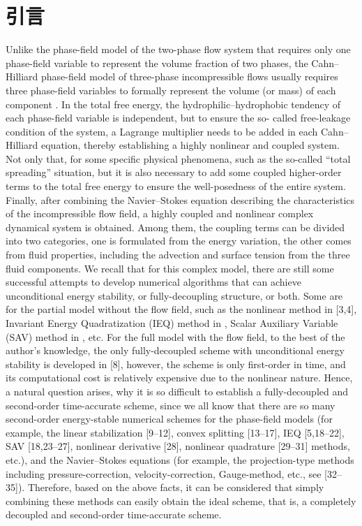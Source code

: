 \section{引言}
\label{sec:intro}
Unlike the phase-field model of the two-phase flow system that requires only one phase-field variable to represent the volume fraction of two phases, the Cahn–Hilliard phase-field model of three-phase incompressible flows usually requires three phase-field variables to formally represent the volume (or mass) of each component \cite{Kim2005Interfaces,Boyer2011esaim,Boyer2010Transp,Boyer2006M2AN}. In the total free energy, the hydrophilic–hydrophobic tendency of each phase-field variable is independent, but to ensure the so- called free-leakage condition of the system, a Lagrange multiplier needs to be added in each Cahn–Hilliard equation, thereby establishing a highly nonlinear and coupled system. Not only that, for some specific physical phenomena, such as the so-called “total spreading” situation, but it is also necessary to add some coupled higher-order terms to the total free energy to ensure the well-posedness of the entire system. Finally, after combining the Navier–Stokes equation describing the characteristics of the incompressible flow field, a highly coupled and nonlinear complex dynamical system is obtained. Among them, the coupling terms can be divided into two categories, one is formulated from the energy variation, the other comes from fluid properties, including the advection and surface tension from the three fluid components.
We recall that for this complex model, there are still some successful attempts to develop numerical algorithms that can achieve unconditional energy stability, or fully-decoupling structure, or both. Some are for the partial model without the flow field, such as the nonlinear method in [3,4], Invariant Energy Quadratization (IEQ) method in \cite{Yang20173CHM3AS}, Scalar Auxiliary Variable (SAV) method in \cite{Zhang2020threeCHjcp,Zhang2020threeACcmame}, etc. For the full model with the flow field, to the best of the author’s knowledge, the only fully-decoupled scheme with unconditional energy stability is developed in [8], however, the scheme is only first-order in time, and its computational cost is relatively expensive due to the nonlinear nature. Hence, a natural question arises, why it is so difficult to establish a fully-decoupled and second-order time-accurate scheme, since we all know that there are so many second-order energy-stable numerical schemes for the phase-field models (for example, the linear stabilization [9–12], convex splitting [13–17], IEQ [5,18–22], SAV [18,23–27], nonlinear derivative [28], nonlinear quadrature [29–31] methods, etc.), and the Navier–Stokes equations (for example, the projection-type methods including pressure-correction, velocity-correction, Gauge-method, etc., see [32–35]). Therefore, based on the above facts, it can be considered that simply combining these methods can easily obtain the ideal scheme, that is, a completely decoupled and second-order time-accurate scheme.

